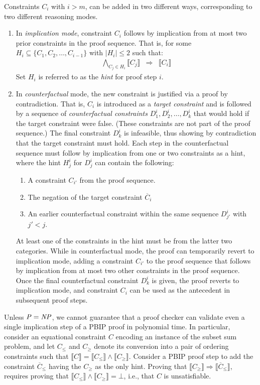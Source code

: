 \documentclass{easychair}
\newcommand{\nil}{\bot}
\renewcommand{\obar}[1]{\overline{#1}}
\newcommand{\imply}{\Rightarrow}
\newcommand{\func}[1]{\llbracket#1\rrbracket}
\begin{document}
Constraints $C_{i}$ with $i > m$, can be added in two different ways, corresponding to two different reasoning modes.
\begin{enumerate}
\item In {\em implication mode}, constraint $C_i$ follows by implication from at most two prior constraints in the  proof sequence.
  That is, for some $H_i \subseteq \{C_1, C_2,
  \ldots, C_{i-1}\}$ with $|H_i| \leq 2$ such that:
\begin{eqnarray}
\bigwedge_{C_j \in H_i} \func{C_j} & \imply & \func{C_i} \label{eqn:implicationmode}
\end{eqnarray}
Set $H_i$ is referred to as the {\em hint} for proof step $i$.
\item In {\em counterfactual} mode, the new constraint is justified
  via a proof by contradiction.  That is, $C_i$ is introduced as a
  {\em target constraint} 
and is followed by a sequence of {\em
    counterfactual constraints} $D^{i}_1, D^{i}_2, \ldots, D^{i}_k$
  that would hold if the target constraint were false.  (These constraints are not part of the proof sequence.) The final
  constraint $D^{i}_k$ is infeasible, thus showing by contradiction
  that the target constraint must hold.
  Each step in the counterfactual
  sequence must follow by implication from one or two constraints as a hint,
  where the hint $H^{i}_j$ for $D^{i}_j$ can contain the following:
  \begin{enumerate}
  \item A constraint $C_{i'}$ from the proof sequence.
  \item The negation of the target constraint $\obar{C}_i$
  \item An earlier counterfactual constraint within the same sequence $D^{i}_{j'}$ with $j' < j$.
  \end{enumerate}
  At least one of the constraints in the hint must be from the latter two categories.
  While in counterfactual mode, the proof can temporarily revert to
  implication mode, adding a constraint $C_{i'}$ to the proof sequence
  that follows by implication from at most two other constraints in the proof sequence.
  Once the final counterfactual constraint $D^{i}_k$ is given, the proof reverts to implication mode, and constraint $C_i$ can be used
  as the antecedent in subsequent proof steps.
\end{enumerate}

Unless ${\it P} = {\it NP}$, we cannot guarantee that a proof checker
can validate even a single implication step of a PBIP proof in polynomial time.
In particular, consider an equational constraint $C$ encoding an
instance of the subset sum problem, and let $C_{\leq}$ and $C_{\geq}$
denote its conversion into a pair of ordering constraints such that
$\func{C} = \func{C_{\leq}} \land \func{C_{\geq}}$.  Consider a PBIP
proof step to add the constraint $\obar{C}_{\leq}$ having the 
$C_{\geq}$ as the only hint.  Proving that
$\func{C_{\geq}} \imply \func{\obar{C}_{\leq}}$, requires proving that
$\func{C_{\leq}} \land \func{C_{\geq}} = \nil$, i.e., that $C$ is unsatisfiable.
\end{document}
